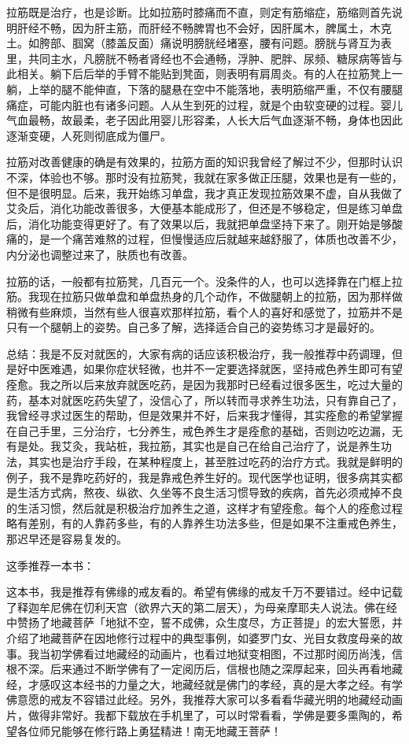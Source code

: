 拉筋既是治疗，也是诊断。比如拉筋时膝痛而不直，则定有筋缩症，筋缩则首先说明肝经不畅，因为肝主筋，而肝经不畅脾胃也不会好，因肝属木，脾属土，木克土。如胯部、腘窝（膝盖反面）痛说明膀胱经堵塞，腰有问题。膀胱与肾互为表里，共同主水，凡膀胱不畅者肾经也不会通畅，浮肿、肥胖、尿频、糖尿病等皆与此相关。躺下后后举的手臂不能贴到凳面，则表明有肩周炎。有的人在拉筋凳上一躺，上举的腿不能伸直，下落的腿悬在空中不能落地，表明筋缩严重，不仅有腰腿痛症，可能内脏也有诸多问题。人从生到死的过程，就是个由软变硬的过程。婴儿气血最畅，故最柔，老子因此用婴儿形容柔，人长大后气血逐渐不畅，身体也因此逐渐变硬，人死则彻底成为僵尸。

拉筋对改善健康的确是有效果的，拉筋方面的知识我曾经了解过不少，但那时认识不深，体验也不够。那时没有拉筋凳，我就在家多做正压腿，效果也是有一些的，但不是很明显。后来，我开始练习单盘，我才真正发现拉筋效果不虚，自从我做了艾灸后，消化功能改善很多，大便基本能成形了，但还是不够稳定，但是练习单盘后，消化功能变得更好了。有了效果以后，我就把单盘坚持下来了。刚开始是够酸痛的，是一个痛苦难熬的过程，但慢慢适应后就越来越舒服了，体质也改善不少，内分泌也调整过来了，肤质也有改善。

拉筋的话，一般都有拉筋凳，几百元一个。没条件的人，也可以选择靠在门框上拉筋。我现在拉筋只做单盘和单盘热身的几个动作，不做腿朝上的拉筋，因为那样做稍微有些麻烦，当然有些人很喜欢那样拉筋，看个人的喜好和感觉了，拉筋并不是只有一个腿朝上的姿势。自己多了解，选择适合自己的姿势练习才是最好的。

总结：我是不反对就医的，大家有病的话应该积极治疗，我一般推荐中药调理，但是好中医难遇，如果你症状轻微，也并不一定要选择就医，坚持戒色养生即可有望痊愈。我之所以后来放弃就医吃药，是因为我那时已经看过很多医生，吃过大量的药，基本对就医吃药失望了，没信心了，所以转而寻求养生功法，只有靠自己了，我曾经寻求过医生的帮助，但是效果并不好，后来我才懂得，其实痊愈的希望掌握在自己手里，三分治疗，七分养生，戒色养生才是痊愈的基础，否则边吃边漏，无有是处。我艾灸，我站桩，我拉筋，其实也是自己在给自己治疗了，说是养生功法，其实也是治疗手段，在某种程度上，甚至胜过吃药的治疗方式。我就是鲜明的例子，我不是靠吃药好的，我是靠戒色养生好的。现代医学也证明，很多病其实都是生活方式病，熬夜、纵欲、久坐等不良生活习惯导致的疾病，首先必须戒掉不良的生活习惯，然后就是积极治疗加养生之道，这样才有望痊愈。每个人的痊愈过程略有差别，有的人靠药多些，有的人靠养生功法多些，但是如果不注重戒色养生，那迟早还是容易复发的。

这季推荐一本书：

\begin{book}
    这本书，我是推荐有佛缘的戒友看的。希望有佛缘的戒友千万不要错过。经中记载了释迦牟尼佛在忉利天宫（欲界六天的第二层天），为母亲摩耶夫人说法。佛在经中赞扬了地藏菩萨「地狱不空，誓不成佛，众生度尽，方正菩提」的宏大誓愿，并介绍了地藏菩萨在因地修行过程中的典型事例，如婆罗门女、光目女救度母亲的故事。我当初学佛看过地藏经的动画片，也看过地狱变相图，不过那时阅历尚浅，信根不深。后来通过不断学佛有了一定阅历后，信根也随之深厚起来，回头再看地藏经，才感叹这本经书的力量之大，地藏经就是佛门的孝经，真的是大孝之经。有学佛意愿的戒友不容错过此经。另外，我推荐大家可以多看看华藏光明的地藏经动画片，做得非常好。我都下载放在手机里了，可以时常看看，学佛是要多熏陶的，希望各位师兄能够在修行路上勇猛精进！南无地藏王菩萨！
\end{book}

